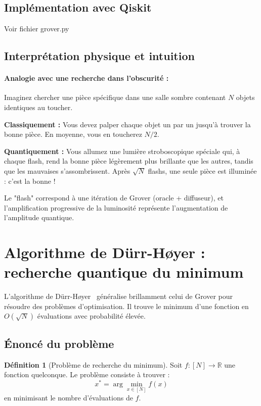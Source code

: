 \documentclass[12pt,a4paper]{article}
\theoremstyle{definition}
\newtheorem{definition}[theorem]{Définition}
\theoremstyle{remark}
\begin{document}
\subsection{Implémentation avec Qiskit}

Voir fichier grover.py

\subsection{Interprétation physique et intuition}

\paragraph{Analogie avec une recherche dans l'obscurité :}
Imaginez chercher une pièce spécifique dans une salle sombre contenant $N$ objets identiques au toucher.

\textbf{Classiquement :} Vous devez palper chaque objet un par un jusqu'à trouver la bonne pièce. En moyenne, vous en toucherez $N/2$.

\textbf{Quantiquement :} Vous allumez une lumière stroboscopique spéciale qui, à chaque flash, rend la bonne pièce légèrement plus brillante que les autres, tandis que les mauvaises s'assombrissent. Après $\sqrt{N}$ flashs, une seule pièce est illuminée : c'est la bonne !

Le "flash" correspond à une itération de Grover (oracle + diffuseur), et l'amplification progressive de la luminosité représente l'augmentation de l'amplitude quantique.

\newpage

\section{Algorithme de Dürr-Høyer : recherche quantique du minimum}

L'algorithme de Dürr-Høyer~\cite{durr1996} généralise brillamment celui de Grover pour résoudre des problèmes d'optimisation. Il trouve le minimum d'une fonction en $O(\sqrt{N})$ évaluations avec probabilité élevée.

\subsection{Énoncé du problème}

\begin{definition}[Problème de recherche du minimum]
Soit $f : [N] \to \mathbb{R}$ une fonction quelconque. Le problème consiste à trouver :
\[
x^* = \arg\min_{x \in [N]} f(x)
\]
en minimisant le nombre d'évaluations de $f$.
\end{definition}
\end{document}
